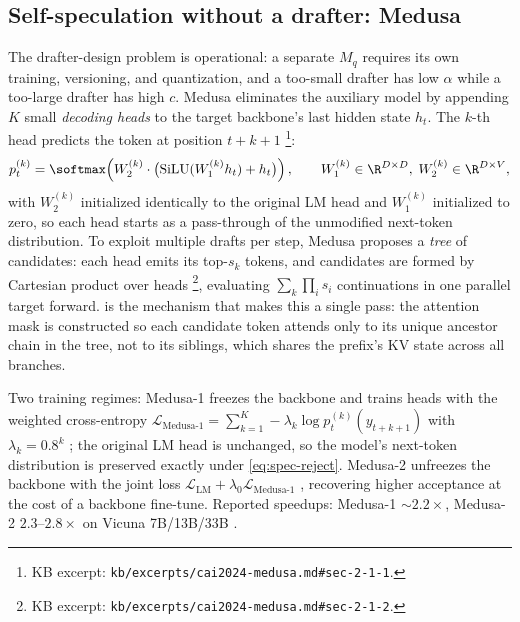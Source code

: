 \subsection{Self-speculation without a drafter: Medusa}
\label{sec:mt-medusa}

The drafter-design problem is operational: a separate $M_q$ requires
its own training, versioning, and quantization, and a too-small drafter
has low $\alpha$ while a too-large drafter has high $c$. Medusa
\citep{cai2024-medusa} eliminates the auxiliary model by appending
$K$ small \emph{decoding heads} to the target backbone's last hidden
state $h_t$. The $k$-th head predicts the token at position $t + k +
1$ \citep[\S 2.1.1]{cai2024-medusa}\footnote{KB excerpt:
\nolinkurl{kb/excerpts/cai2024-medusa.md#sec-2-1-1}.}:
\begin{equation}
p_t^{(k)} = \softmax\!\left(W_2^{(k)} \cdot \bigl(\operatorname{SiLU}(W_1^{(k)} h_t) + h_t\bigr)\right),
\qquad W_1^{(k)} \in \R^{D \times D}, \; W_2^{(k)} \in \R^{D \times V},
\label{eq:medusa-head}
\end{equation}
with $W_2^{(k)}$ initialized identically to the original LM head and
$W_1^{(k)}$ initialized to zero, so each head starts as a pass-through
of the unmodified next-token distribution. To exploit multiple drafts
per step, Medusa proposes a \emph{tree} of candidates: each head emits
its top-$s_k$ tokens, and candidates are formed by Cartesian product
over heads \citep[\S 2.1.2]{cai2024-medusa}\footnote{KB excerpt:
\nolinkurl{kb/excerpts/cai2024-medusa.md#sec-2-1-2}.}, evaluating
$\sum_k \prod_i s_i$ continuations in one parallel target forward.
\emph{} is the mechanism that makes this a single pass:
the attention mask is constructed so each candidate token attends only
to its unique ancestor chain in the tree, not to its siblings, which
shares the prefix's KV state across all branches.

Two training regimes:
Medusa-1 freezes the backbone and trains heads with the weighted
cross-entropy
$\mathcal{L}_{\text{Medusa-1}} = \sum_{k=1}^{K} -\lambda_k \log p_t^{(k)}(y_{t+k+1})$
with $\lambda_k = 0.8^k$ \citep[\S 2.2.1, Eq.~1]{cai2024-medusa};
the original LM head is unchanged, so the model's next-token
distribution is preserved exactly under \cref{eq:spec-reject}.
Medusa-2 unfreezes the backbone with the joint loss
$\mathcal{L}_{\text{LM}} + \lambda_0 \mathcal{L}_{\text{Medusa-1}}$
\citep[\S 2.2.2]{cai2024-medusa}, recovering higher acceptance at the
cost of a backbone fine-tune. Reported speedups: Medusa-1
$\sim 2.2\times$, Medusa-2 $2.3$--$2.8\times$ on Vicuna 7B/13B/33B
\citep[abstract]{cai2024-medusa}.

